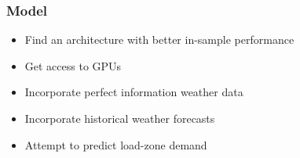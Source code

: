 \documentclass{beamer}
\begin{document}
\begin{frame}
  \frametitle{Model}
  \begin{itemize}
  \item Find an architecture with better in-sample performance
  \item Get access to GPUs
  \item Incorporate perfect information weather data
  \item Incorporate historical weather forecasts
  \item Attempt to predict load-zone demand
  \end{itemize}
\end{frame}
\end{document}
